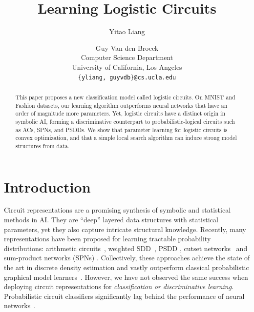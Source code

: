 \documentclass[letterpaper]{article} %
\begin{document}
%
\title{Learning Logistic Circuits}
\author{Yitao Liang \and Guy Van den Broeck\\
Computer Science Department\\
University of California, Los Angeles\\
\texttt{\{yliang, guyvdb\}@cs.ucla.edu}\\
}


\maketitle

\begin{abstract}
This paper proposes a new classification model called logistic circuits. On MNIST and Fashion datasets, our learning algorithm outperforms neural networks that have an order of magnitude more parameters. Yet, logistic circuits have a distinct origin in symbolic AI, forming a discriminative counterpart to probabilistic-logical circuits such as ACs, SPNs, and PSDDs.
We show that parameter learning for logistic circuits is convex optimization, and that a simple local search algorithm can induce strong model structures from data.
\end{abstract}

\section{Introduction}
Circuit representations are a promising synthesis of symbolic and statistical methods in AI. They are ``deep'' layered data structures with statistical parameters, yet they also capture intricate structural knowledge.
Recently, many representations have been proposed for learning tractable probability distributions: arithmetic circuits~\cite{lowd:uai08}, weighted SDD~\cite{BekkerNIPS15}, PSDD \cite{KisaVCD14}, cutset networks~\cite{rahman2014cutset} and sum-product networks (SPNs) \cite{poon2011sum}.
Collectively, these approaches achieve the state of the art in discrete density estimation and vastly outperform classical probabilistic graphical model learners~\cite{gens2013learning,rooshenas2014learning,adel2015learning,rahman2016merging,Liang2017}. However, we have not observed the same success when deploying circuit representations for \emph{classification or discriminative learning}. Probabilistic circuit classifiers significantly lag behind the performance of neural networks~\cite{classificationStanding}.
\end{document}
